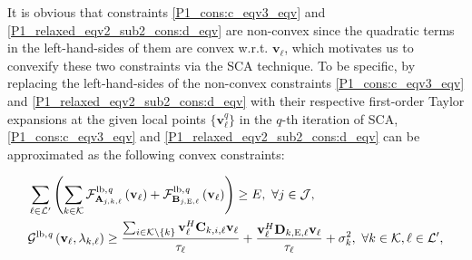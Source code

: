 \documentclass[12pt,draftclsnofoot, onecolumn]{IEEEtran}
\theoremstyle{plain}
\begin{document}
\begin{sloppypar}
It is obvious that constraints \eqref{P1_cons:c_eqv3_eqv} and \eqref{P1_relaxed_eqv2_sub2_cons:d_eqv} are non-convex since the quadratic terms in the left-hand-sides of them are convex w.r.t. $\mathbf v_\ell$, which motivates us to convexify these two constraints via the SCA technique. To be specific, by replacing the left-hand-sides of the non-convex constraints \eqref{P1_cons:c_eqv3_eqv} and \eqref{P1_relaxed_eqv2_sub2_cons:d_eqv} with their respective first-order Taylor expansions at the given local points $\{\mathbf v_\ell^q\}$ in the $q$-th iteration of SCA, \eqref{P1_cons:c_eqv3_eqv} and \eqref{P1_relaxed_eqv2_sub2_cons:d_eqv} can be approximated as the following convex constraints:
\iffalse 
\begin{align}
& \sum_{\ell\in\mathcal L'}\left(\sum_{k\in\mathcal K}\left(2{\rm Re}\left\lbrace \mathbf v_\ell^H\mathbf A_{j,k,\ell}\mathbf v_\ell^q\right\rbrace - \big(\mathbf v_\ell^q\big)^H\mathbf A_{j,k,\ell}\mathbf v_\ell^q\right) + 2{\rm Re}\left\lbrace\mathbf v_\ell^H\mathbf B_{j,\mathrm E,\ell}\mathbf v_\ell^q\right\rbrace - \big(\mathbf v_\ell^q\big)^H\mathbf B_{j,\mathrm E,\ell}\mathbf v_\ell^q\right) \geq E, 
\nonumber\\
& \forall j\in\mathcal J, \\
& \frac{2{\rm Re}\left\lbrace\mathbf v_\ell\mathbf C_{k,k,\ell}\mathbf v_\ell^q\right\rbrace}{\tau_\ell\lambda_{k,\ell}^q} - \frac{\big(\mathbf v_\ell^q\big)^H\mathbf C_{k,k,\ell}\mathbf v_\ell^q}{\tau_\ell\left( \lambda_{k,\ell}^q\right)^2} \geq \frac{\sum_{i\in \mathcal K\backslash\{k\}}\mathbf v_\ell^H\mathbf C_{k,i,\ell} \mathbf v_\ell}{\tau_\ell} \!+\! \frac{\mathbf v_\ell^H\mathbf D_{k,\mathrm E,\ell}\mathbf v_\ell}{\tau_\ell} \!+\! \sigma_k^2, \ \forall k\in\mathcal K, \ell\in\mathcal L', 
\end{align}%
\fi
\begin{align}
& \sum_{\ell\in\mathcal L'}\left(\sum_{k\in\mathcal K} \mathcal F^{\rm lb,\it q}_{\mathbf A_{j,k,\ell}}\left(\mathbf v_\ell\right) + \mathcal F^{\rm lb,\it q}_{\mathbf B_{j,\mathrm E,\ell}}\left(\mathbf v_\ell\right)\right) \geq E, \ \forall j\in\mathcal J, \label{P1_cons:c_eqv3_eqv_sca}\\
& \mathcal G^{\rm lb, \it q}\left(\mathbf v_\ell, \lambda_{k,\ell}\right) \geq \frac{\sum_{i\in \mathcal K\backslash\{k\}}\mathbf v_\ell^H\mathbf C_{k,i,\ell} \mathbf v_\ell}{\tau_\ell} + \frac{\mathbf v_\ell^H\mathbf D_{k,\mathrm E,\ell}\mathbf v_\ell}{\tau_\ell} + \sigma_k^2, \ \forall k\in\mathcal K, \ell\in\mathcal L', \label{P1_relaxed_eqv2_sub2_cons:d_eqv_sca}

\end{align}
\end{sloppypar}
\end{document}
